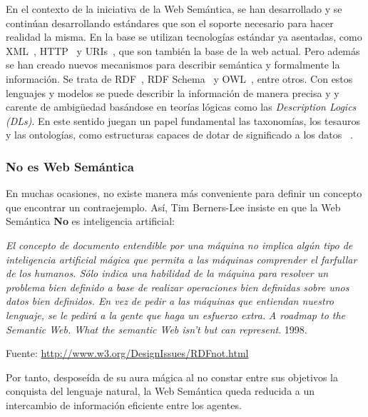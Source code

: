 En el contexto de la iniciativa de la Web Semántica, se han desarrollado y se continúan
desarrollando estándares que son el soporte necesario para hacer realidad la misma.
En la base se utilizan tecnologías estándar ya asentadas, como \gls{XML}~\cite{XML11}, \gls{HTTP}~\cite{http-rfc} y \gls{URI}s~\cite{uri-rfc},
que son también la base de la web actual. Pero además se han creado nuevos mecanismos
para describir semántica y formalmente la información.
Se trata de \gls{RDF}~\cite{RDF}, \gls{RDF Schema}~\cite{RDFS} y \gls{OWL}~\cite{OWL11,owl2-primer}, entre
otros. Con estos lenguajes y modelos se puede describir la información de manera precisa y
y carente de ambig\"{u}edad basándose en teorías lógicas como las \textit{Description Logics~\cite{baader03description} (\gls{DL}s)}.
En este sentido juegan un papel fundamental las taxonomías, los tesauros y las ontologías,
como estructuras capaces de dotar de significado a los datos 
~\cite{Benjamins98knowledgemanagement}.

\subsubsection{No es Web Semántica}
En muchas ocasiones, no existe manera más conveniente para definir un concepto que encontrar
un contraejemplo. Así, Tim Berners-Lee 
insiste en que la Web Semántica \textbf{No} es inteligencia artificial: 
\begin{Frame}
\textit{El concepto de documento entendible por una máquina no implica algún tipo de
inteligencia artificial mágica que permita a las máquinas comprender el
farfullar de los humanos. Sólo indica una habilidad de la máquina para resolver
un problema bien definido a base de realizar operaciones bien definidas sobre
unos datos bien definidos. En vez de pedir a las máquinas que entiendan nuestro
lenguaje, se le pedirá a la gente que haga un esfuerzo extra.} \textit{A roadmap
to the Semantic Web.  What the semantic Web isn't but can represent}. 1998. 

Fuente: \url{http://www.w3.org/DesignIssues/RDFnot.html}
\end{Frame}

Por tanto, desposeída de su aura mágica al no constar entre sus objetivos la
conquista del lenguaje natural, la Web Semántica queda reducida a un intercambio
de información eficiente entre los agentes.
